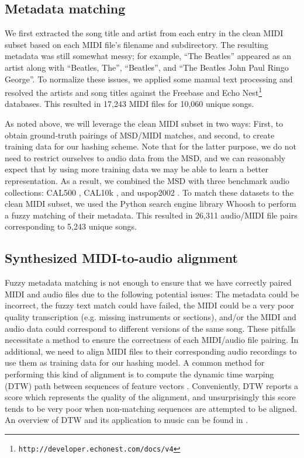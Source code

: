 \documentclass{article}
\begin{document}
\subsection{Metadata matching}

We first extracted the song title and artist from each entry in the clean MIDI subset based on each MIDI file's filename and subdirectory.
The resulting metadata was still somewhat messy; for example, ``The Beatles'' appeared as an artist along with ``Beatles, The'', ``Beatles'', and ``The Beatles John Paul Ringo George''.
To normalize these issues, we applied some manual text processing and resolved the artists and song titles against the Freebase \cite{bollacker2008freebase} and Echo Nest\footnote{\texttt{http://developer.echonest.com/docs/v4}} databases.
This resulted in 17,243 MIDI files for 10,060 unique songs.

As noted above, we will leverage the clean MIDI subset in two ways: First, to obtain ground-truth pairings of MSD/MIDI matches, and second, to create training data for our hashing scheme.
Note that for the latter purpose, we do not need to restrict ourselves to audio data from the MSD, and we can reasonably expect that by using more training data we may be able to learn a better representation.
As a result, we combined the MSD with three benchmark audio collections: CAL500 \cite{turnbull2007towards}, CAL10k \cite{tingle2010exploring}, and uspop2002 \cite{berenzweig2004large}.
To match these datasets to the clean MIDI subset, we used the Python search engine library Whoosh to perform a fuzzy matching of their metadata.
This resulted in 26,311 audio/MIDI file pairs corresponding to 5,243 unique songs.

\subsection{Synthesized MIDI-to-audio alignment}

Fuzzy metadata matching is not enough to ensure that we have correctly paired MIDI and audio files due to the following potential issues: The metadata could be incorrect, the fuzzy text match could have failed, the MIDI could be a very poor quality transcription (e.g. missing instruments or sections), and/or the MIDI and audio data could correspond to different versions of the same song.
These pitfalls necessitate a method to ensure the correctness of each MIDI/audio file pairing.
In additional, we need to align MIDI files to their corresponding audio recordings to use them as training data for our hashing model.
A common method for performing this kind of alignment is to compute the dynamic time warping (DTW) path between sequences of feature vectors \cite{turetsky2003ground, hu2003polyphonic,ewert2012towards}.
Conveniently, DTW reports a score which represents the quality of the alignment, and unsurprisingly this score tends to be very poor when non-matching sequences are attempted to be aligned.
An overview of DTW and its application to music can be found in \cite{muller2007information}.
\end{document}
